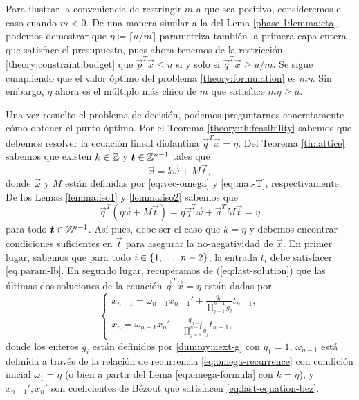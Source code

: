 \begin{observation}
	Para ilustrar la conveniencia de restringir $m$ a que sea positivo, consideremos el caso cuando
	$m < 0$. De una manera similar a la del Lema \ref{phase-1:lemma:eta}, podemos demostrar que
	$\eta \coloneq \lceil u/m \rceil$ parametriza también la primera capa entera que satisface el
	presupuesto, pues ahora tenemos de la restricción \eqref{theory:constraint:budget} que
	$\vec{p}^T\vec{x} \leq u$ si y solo si $\vec{q}^T\vec{x} \geq u/m$. Se sigue cumpliendo que el
	valor óptimo del problema \eqref{theory:formulation} es $m\eta$. Sin embargo, $\eta$ ahora es el
	múltiplo más chico de $m$ que satisface $m\eta \geq u$.
\end{observation}

Una vez resuelto el problema de decisión, podemos preguntarnos concretamente cómo obtener el punto
óptimo. Por el Teorema \ref{theory:th:feasibility} sabemos que debemos resolver la ecuación lineal
diofantina $\vec{q}^T\vec{x} = \eta$. Del Teorema \ref{th:lattice} sabemos que existen $k \in \mathbb{Z}$ y
$\boldsymbol{t} \in \mathbb{Z}^{n-1}$ tales que
\begin{equation*}
	\vec{x} = k\vec{\omega} + M\vec{t},
\end{equation*}
donde $\vec{\omega}$ y $M$ están definidas por \eqref{eq:vec-omega} y \eqref{eq:mat-T},
respectivamente. De los Lemas \ref{lemma:iso1} y \ref{lemma:iso2} sabemos que
\begin{equation*}
	\vec{q}^T\left(\eta\vec{\omega} + M\vec{t}\right) = \eta\vec{q}^T\vec{\omega} + \vec{q}^TM\vec{t} = \eta
\end{equation*}
para todo $\boldsymbol{t} \in \mathbb{Z}^{n-1}$. Así pues, debe ser el caso que $k = \eta$ y debemos encontrar
condiciones suficientes en $\vec{t}$ para asegurar la no-negatividad de $\vec{x}$. En primer lugar,
sabemos que para todo $i \in \lbrace 1, \ldots, n - 2 \rbrace$, la entrada $t_i$ debe satisfacer
\eqref{eq:param-lb}. En segundo lugar, recuperamos de (\ref{eq:last-solution}) que las últimas dos
soluciones de la ecuación $\vec{q}^T\vec{x} = \eta$ están dadas por
\begin{equation}
	\begin{cases}
		x_{n-1} = \omega_{n-1}x_{n-1}' + \frac{q_n}{\prod_{j=1}^{n-1}g_j}t_{n-1}, \\
		x_n = \omega_{n-1}x_n' - \frac{q_{n-1}}{\prod_{j=1}^{n-1}g_j}t_{n-1},
	\end{cases}
\end{equation}
donde los enteros $g_i$ están definidos por \eqref{dummy:next-g} con $g_1 = 1$, $\omega_{n-1}$ está
definida a través de la relación de recurrencia \eqref{eq:omega-recurrence} con condición inicial
$\omega_1 = \eta$ (o bien a partir del Lema \ref{eq:omega-formula} con $k = \eta$), y $x_{n-1}',
x_n'$ son coeficientes de Bézout que satisfacen \eqref{eq:last-equation-bez}.

